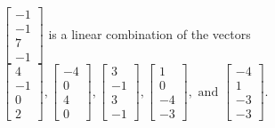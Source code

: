 \begin{exercise}
\begin{exerciseStatement}
  \end{exerciseStatement}
  \begin{exerciseAnswer}
   \(\left[\begin{array}{c}
-1 \\
-1 \\
7 \\
-1
\end{array}\right]\) 
  	 is  
	a linear combination of the vectors \(\left[\begin{array}{c}
4 \\
-1 \\
0 \\
2
\end{array}\right] , \left[\begin{array}{c}
-4 \\
0 \\
4 \\
0
\end{array}\right] , \left[\begin{array}{c}
3 \\
-1 \\
3 \\
-1
\end{array}\right] , \left[\begin{array}{c}
1 \\
0 \\
-4 \\
-3
\end{array}\right] , \text{ and } \left[\begin{array}{c}
-4 \\
1 \\
-3 \\
-3
\end{array}\right]\).

	
  


  \end{exerciseAnswer}
\end{exercise}